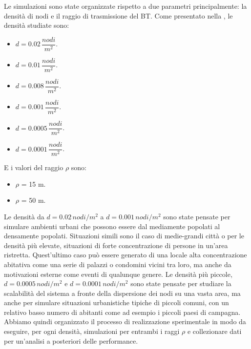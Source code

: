 Le simulazioni sono state organizzate rispetto a due parametri principalmente: la densità di nodi e il raggio di trasmissione del BT. Come presentato nella , le densità studiate sono:
\begin{itemize}
	\item $d = 0.02 \, \dfrac{nodi}{m^{2}} $.
	\item $d = 0.01 \, \dfrac{nodi}{m^{2}} $.
	\item $d = 0.008 \, \dfrac{nodi}{m^{2}} $.
	\item $d = 0.001 \, \dfrac{nodi}{m^{2}} $.
	\item $d = 0.0005 \, \dfrac{nodi}{m^{2}} $.
	\item $d = 0.0001 \, \dfrac{nodi}{m^{2}} $.
\end{itemize}
E i valori del raggio $\rho$ sono:
\begin{itemize}
	\item $\rho$ = 15 m.
	\item $\rho$ = 50 m.
\end{itemize}
Le densità da $d=0.02\,nodi/m^2$ a $d=0.001\, nodi/m^2$ sono state pensate per simulare ambienti urbani che possono essere dal mediamente popolati al densamente popolati. Situazioni simili sono il caso di medie-grandi città o per le densità più elevate, situazioni di forte concentrazione di persone in un'area ristretta. Quest'ultimo caso può essere generato di una locale alta concentrazione abitativa come una serie di palazzi o condomini vicini tra loro, ma anche da motivazioni esterne come eventi di qualunque genere. Le densità più piccole, $d=0.0005\, nodi/m^2$ e $d=0.0001\, nodi/m^2$ sono state pensate per studiare la scalabilità del sistema a fronte della dispersione dei nodi su una vasta area, ma anche per simulare situazioni urbanistiche tipiche di piccoli comuni, con un relativo basso numero di abitanti come ad esempio i piccoli paesi di campagna. Abbiamo quindi organizzato il processo di realizzazione sperimentale in modo da eseguire, per ogni densità, simulazioni per entrambi i raggi $\rho$ e collezionare dati per un'analisi a posteriori delle performance.

